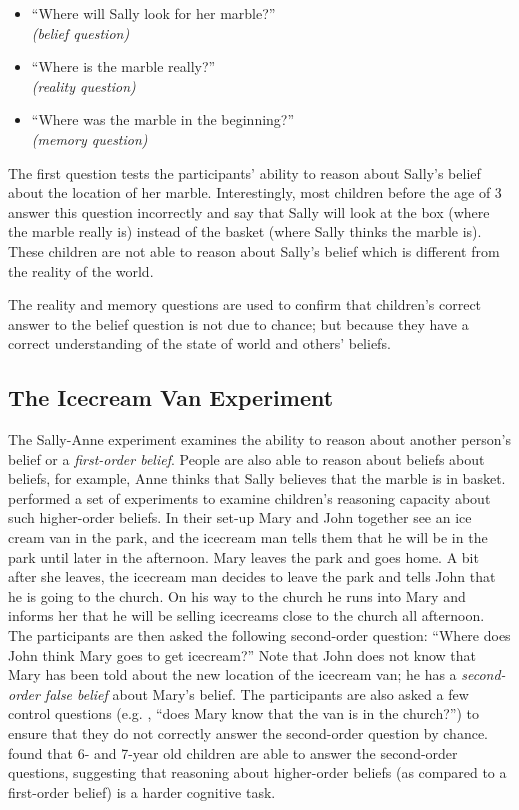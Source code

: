 \begin{itemize}
    \item ``Where will Sally look for her marble?''   \\ \textit{(belief question)}  
    \item ``Where is the marble really?''             \\ \textit{(reality question)} 
    \item ``Where was the marble in the beginning?''  \\ \textit{(memory question)}  
\end{itemize}

The first question tests the participants' ability to reason about Sally's belief about the location of her marble. Interestingly, most children before the age of 3 answer this question incorrectly and say that Sally will look at the box (where the marble really is) instead of the basket (where Sally thinks the marble is). These children are not able to reason about Sally's belief which is different from the reality of the world. 

The reality and memory questions are used to confirm that children's correct answer to the belief question is not due to chance; but because they have a correct understanding of the state of world and others' beliefs. 

\subsection{The Icecream Van Experiment} The Sally-Anne experiment examines the ability to reason about another person's belief or a \textit{first-order belief}. People are also able to reason about beliefs about beliefs, for example, Anne thinks that Sally believes that the marble is in basket. \citet{perner.wimmer.1985} performed a set of experiments to examine children's reasoning capacity about such higher-order beliefs. In their set-up Mary and John together see an ice cream van in the park, and the icecream man tells them that he will be in the park until later in the afternoon. Mary leaves the park and goes home. A bit after she leaves, the icecream man decides to leave the park and tells John that he is going to the church. On his way to the church he runs into Mary and informs her that he will be selling icecreams close to the church all afternoon. The participants are then asked the following second-order question: ``Where does John think Mary goes to get icecream?'' Note that John does not know that Mary has been told about the new location of the icecream van; he has a \textit{second-order false belief} about Mary's belief. The participants are also asked a few control questions (e.g. , ``does Mary know that the van is in the church?'') to ensure that they do not correctly answer the second-order question by chance.
\citet{perner.wimmer.1985} found that  6- and 7-year old children are able to answer the second-order questions, suggesting that reasoning about higher-order beliefs (as compared to a first-order belief) is a harder cognitive task.

